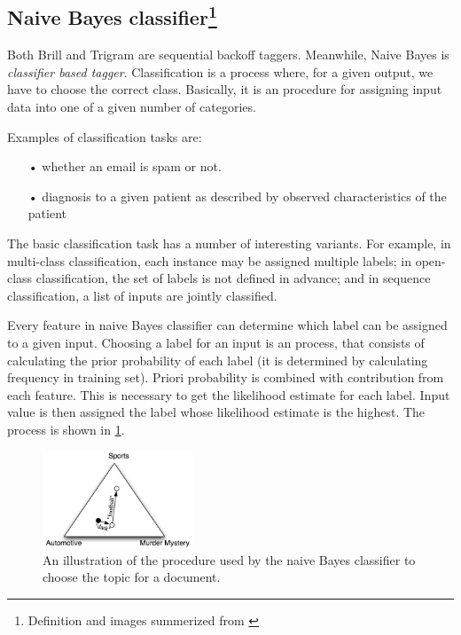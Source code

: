 \documentclass[10pt, conference, compsocconf]{IEEEtran}
\begin{document}
\subsection[Naive Bayes classifier]{Naive Bayes classifier\footnote{Definition and images summerized from \cite{NLTKBOOK}}}
Both Brill and Trigram are sequential backoff taggers. Meanwhile, Naive Bayes is \textit{classifier based tagger}.
Classification is a process where, for a given output, we have to choose the correct class. Basically, it is an  procedure for assigning  input data into one of a given number of categories.

Examples of classification tasks are:
\begin{itemize}
\item[•] whether an email is spam or not.
\item[•] diagnosis to a given patient as described by observed characteristics of the patient
\end{itemize}
The basic classification task has a number of interesting variants. For example, in multi-class classification, each instance may be assigned multiple labels; in open-class classification, the set of labels is not defined in advance; and in sequence classification, a list of inputs are jointly classified.


Every feature in naive Bayes classifier can determine which label can be assigned to a given input. Choosing a label for an input is an process, that consists of calculating the prior probability of each label (it is determined by calculating frequency in training set). Priori probability is combined with contribution from each feature. This is necessary to get the likelihood estimate for each label. Input value is then assigned the label whose likelihood estimate is the highest. The process is shown in \ref{fig:naive-bayes-triangle}.

\begin{figure}[htb]
\begin{center}
\includegraphics[width=0.4\textwidth]{naive-bayes-triangle.png} 
\end{center}
\caption{An illustration of the procedure used by the naive Bayes classifier to choose the topic for a document.}
\label{fig:naive-bayes-triangle}
\end{figure}
\end{document}
